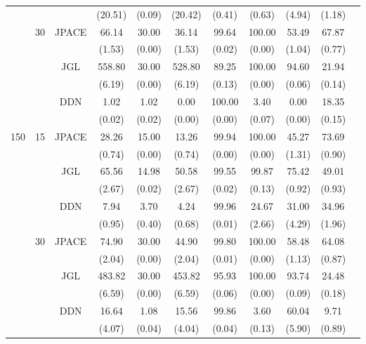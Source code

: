 \documentclass[useAMS,usenatbib,referee]{bio}
\begin{document}
{{\begin{table}[htb!]
{\begin{tabular}{||c|c|c||c|c|c|c|c|c|c||c}
 & & & (20.51) & (0.09) & (20.42) & (0.41) & (0.63) & (4.94) & (1.18) \\\cline{2-10} 
  &\multirow{6}{*}{30}  & \multirow{2}{*}{JPACE} &66.14 & 30.00 & 36.14 & 99.64 & 100.00 & 53.49 & 67.87 \\ 
& & & (1.53) & (0.00) & (1.53) & (0.02) & (0.00) & (1.04) & (0.77) \\ \cline{3-10} 
& & \multirow{2}{*}{JGL} & 558.80 & 30.00 & 528.80 & 89.25 & 100.00 & 94.60 & 21.94 \\ 
 & & & (6.19) & (0.00) & (6.19) & (0.13) & (0.00) & (0.06) & (0.14) \\ \cline{3-10} 
& & \multirow{2}{*}{DDN} & 1.02 & 1.02 & 0.00 & 100.00 & 3.40 & 0.00 & 18.35 \\ 
 & & & (0.02) & (0.02) & (0.00) & (0.00) & (0.07) & (0.00) & (0.15) \\\cline{1-10} 
\multirow{12}{*}{150}  &\multirow{6}{*}{15}  & \multirow{2}{*}{JPACE} &28.26 & 15.00 & 13.26 & 99.94 & 100.00 & 45.27 & 73.69 \\ 
& & & (0.74) & (0.00) & (0.74) & (0.00) & (0.00) & (1.31) & (0.90) \\ \cline{3-10} 
& & \multirow{2}{*}{JGL} & 65.56 & 14.98 & 50.58 & 99.55 & 99.87 & 75.42 & 49.01 \\ 
 & & & (2.67) & (0.02) & (2.67) & (0.02) & (0.13) & (0.92) & (0.93) \\ \cline{3-10} 
& & \multirow{2}{*}{DDN} & 7.94 & 3.70 & 4.24 & 99.96 & 24.67 & 31.00 & 34.96 \\ 
 & & & (0.95) & (0.40) & (0.68) & (0.01) & (2.66) & (4.29) & (1.96) \\\cline{2-10} 
  &\multirow{6}{*}{30}  & \multirow{2}{*}{JPACE} &74.90 & 30.00 & 44.90 & 99.80 & 100.00 & 58.48 & 64.08 \\ 
& & & (2.04) & (0.00) & (2.04) & (0.01) & (0.00) & (1.13) & (0.87) \\ \cline{3-10} 
& & \multirow{2}{*}{JGL} & 483.82 & 30.00 & 453.82 & 95.93 & 100.00 & 93.74 & 24.48 \\ 
 & & & (6.59) & (0.00) & (6.59) & (0.06) & (0.00) & (0.09) & (0.18) \\ \cline{3-10} 
& & \multirow{2}{*}{DDN} & 16.64 & 1.08 & 15.56 & 99.86 & 3.60 & 60.04 & 9.71 \\ 
 & & & (4.07) & (0.04) & (4.04) & (0.04) & (0.13) & (5.90) & (0.89) \\\cline{1-10} 

\end{tabular}
}
\end{table}





}}
\end{document}
